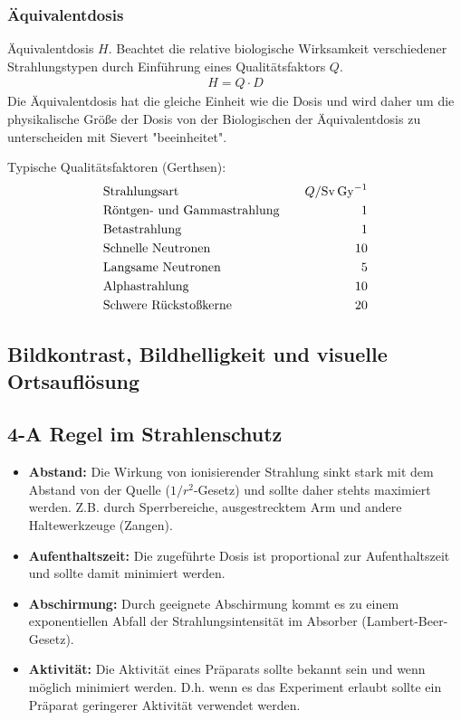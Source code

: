 \documentclass[11pt, a4paper]{article}
\numberwithin{equation}{section}
\begin{document}
\subsubsection{Äquivalentdosis}
Äquivalentdosis $H$.
Beachtet die relative biologische Wirksamkeit verschiedener Strahlungstypen durch Einführung eines Qualitätsfaktors $Q$.
\begin{align}
	H = Q \cdot D
\end{align}
Die Äquivalentdosis hat die gleiche Einheit wie die Dosis und wird daher um die physikalische Größe der Dosis von der Biologischen der Äquivalentdosis zu unterscheiden mit Sievert "beeinheitet".

Typische Qualitätsfaktoren (Gerthsen):
\begin{align*}
	&\text{Strahlungsart} \quad & Q / \si{Sv.Gy\tothe{-1}}\\
	&\text{Röntgen- und Gammastrahlung} \quad & 1 \\
	&\text{Betastrahlung} \quad & 1 \\
	&\text{Schnelle Neutronen} \quad & 10 \\
	&\text{Langsame Neutronen} \quad & 5 \\
	&\text{Alphastrahlung} \quad & 10 \\
	&\text{Schwere Rückstoßkerne} \quad & 20
\end{align*}


\subsection{Bildkontrast, Bildhelligkeit und visuelle Ortsauflösung}


\subsection{4-A Regel im Strahlenschutz}
\begin{itemize}
	\item \textbf{Abstand:}
	Die Wirkung von ionisierender Strahlung sinkt stark mit dem Abstand von der Quelle ($1/r^2$-Gesetz) und sollte daher stehts maximiert werden.
	Z.B. durch Sperrbereiche, ausgestrecktem Arm und andere Haltewerkzeuge (Zangen).
	
	
	\item \textbf{Aufenthaltszeit:}
	Die zugeführte Dosis ist proportional zur Aufenthaltszeit und sollte damit minimiert werden.
	
	
	\item \textbf{Abschirmung:}
	Durch geeignete Abschirmung kommt es zu einem exponentiellen Abfall der Strahlungsintensität im Absorber (Lambert-Beer-Gesetz).
		
	
	\item \textbf{Aktivität:}
	Die Aktivität eines Präparats sollte bekannt sein und wenn möglich minimiert werden.
	D.h. wenn es das Experiment erlaubt sollte ein Präparat geringerer Aktivität verwendet werden.
	
	
\end{itemize}
\end{document}

